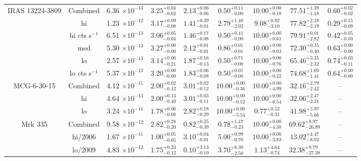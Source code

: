 \documentclass{article}
\begin{document}
\begin{landscape}
\begin{longtable}{ccccccccc}
IRAS 13224-3809 & Combined & 6.36 $\times 10^{-13}$ & $3.25^{+0.04}_{-0.02}$ &  $2.13^{+0.06}_{-0.06}$ & $0.50^{+0.11}_{-0.00}$ & $10.00^{+0.00}_{-0.18}$ & $77.51^{+1.39}_{-1.18}$ & $0.60^{+0.02}_{-0.02}$ \\ 
& hi & 1.23 $\times 10^{-12}$ &  $3.17^{+0.09}_{-0.08}$ &  $1.41^{+0.39}_{-0.01}$ & $2.79^{+1.40}_{-2.02}$ & $9.08^{+0.92}_{-3.10}$ & $77.82^{+2.18}_{-2.19}$ & $0.29^{+0.15}_{-0.09}$ \\ 
& hi cts s$^{-1}$ & 6.51 $\times 10^{-13}$ &  $3.06^{+0.05}_{-0.04}$ &  $1.46^{+0.17}_{-0.08}$ & $0.50^{+0.41}_{-0.00}$ & $10.00^{+0.00}_{-0.61}$ & $79.91^{+0.01}_{-2.82}$ & $0.42^{+0.05}_{-0.03}$ \\ 
& med & 5.30 $\times 10^{-13}$ &  $3.27^{+0.00}_{-0.00}$ & $2.12^{+0.01}_{-0.01}$ & $0.86^{+0.01}_{-0.01}$ & $10.00^{+0.00}_{-0.03}$ & $72.30^{+0.35}_{-0.40}$ & $0.63^{+0.00}_{-0.00}$ \\ 
& lo & 2.57 $\times 10^{-13}$ &  $3.14^{+0.06}_{-0.21}$ & $1.87^{+0.16}_{-0.13}$ & $0.50^{+0.71}_{-0.00}$ & $10.00^{+0.00}_{-0.76}$ & $65.46^{+3.35}_{-2.32}$ & $0.74^{+0.03}_{-0.11}$ \\
& lo cts s$^{-1}$ & 5.37 $\times 10^{-13}$ &  $3.20^{+0.00}_{-0.00}$ &  $1.83^{+0.06}_{-0.08}$ & $0.50^{+0.01}_{-0.00}$ & $10.00^{+0.00}_{-0.22}$ & $74.68^{+1.09}_{-1.41}$ & $0.64^{+0.00}_{-0.00}$ \\ \hline 

MCG-6-30-15 & Combined & 4.12 $\times 10^{-11}$  & $2.00^{+0.02}_{-0.12}$ & $3.01^{+0.02}_{-0.12}$ & $10.00^{+0.00}_{-0.36}$ & $10.00^{+0.00}_{-4.99}$ & $32.16^{+2.79}_{-2.42}$ & --\\ 
& hi & 4.64 $\times 10^{-13}$ & $2.00^{+0.13}_{-0.10}$ & $3.01^{+0.03}_{-0.11}$ & $10.00^{+0.00}_{-0.52}$ & $10.00^{+0.00}_{-0.54}$ & $32.06^{+2.47}_{-2.21}$ & --\\
& lo & 3.24 $\times 10^{-11}$ & $1.78^{+0.06}_{-0.08}$ & $2.82^{+0.18}_{-0.29}$ & $10.00^{+0.00}_{-5.54}$ & $0.77^{+0.52}_{-0.31}$ & $41.98^{+5.97}_{-5.66}$ & --\\  \hline 

Mrk 335 & Combined  & 9.58 $\times 10^{-12}$ & $2.82^{+0.28}_{-0.20}$ & $0.82^{+0.25}_{-0.39}$ & $0.78^{+1.47}_{-0.23}$ & $10.00^{+0.00}_{-4.38}$ & $69.62^{+8.97}_{-26.89}$	& --\\
& hi/2006  & 1.67 $\times 10^{-11}$ & $1.00^{+0.05}_{-0.05}$ & $3.10^{+0.04}_{-0.01}$ & $5.00^{+0.99}_{-0.70}$ & $10.00^{+0.00}_{-3.83}$ & $13.02^{+4.47}_{-8.02}$ & --\\ 
& lo/2009  & 4.83 $\times 10^{-12}$ & $1.75^{+0.23}_{-0.12}$ &  $0.10^{+3.13}_{-0.10}$ & $3.70^{+6.30}_{-2.50}$ & $1.13^{+4.64}_{-0.74}$ & $32.38^{+8.79}_{-27.38}$ & --\\  \hline


\end{longtable}
\end{landscape}
\end{document}
